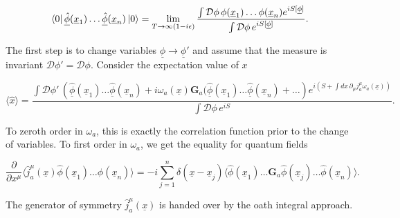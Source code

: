 \begin{equation}
\bra{0} \underline{\hat{\phi}} (\underline{x}_1) \dots \underline{\hat{\phi}} (\underline{x}_n) \ket{0} = \lim_{T \rightarrow \infty(1-i\epsilon)} \frac{\int \mathcal{D}\phi \, \phi (\underline{x}_1) \dots \phi (\underline{x}_n) e^{iS[\underline{\phi}]}}{\int \mathcal{D} \phi \, e^{i S[\underline{\phi}]}}.
\end{equation}

\noindent The first step is to change variables $\underline{\phi} \rightarrow \underline{\phi}'$ and assume that the measure is invariant $\mathcal{D}\phi' = \mathcal{D}\phi$. Consider the expectation value of $x$

\begin{equation}
\langle \hat{x} \rangle = \frac{\int \mathcal{D} \phi' \, \left( \underline{\hat{\phi}} (\underline{x}_1) \dots \underline{\hat{\phi}} (\underline{x}_n) + i \omega_a (\underline{x}) \textbf{G}_a (\underline{\hat{\phi}} (\underline{x}_1) \dots \underline{\hat{\phi}} (\underline{x}_n) + \dots \right) e^{i (S + \int dx \, \partial_\mu j_a^\mu \omega_a (\underline{x}))}}{\int \mathcal{D}\phi \, e^{iS}}.
\end{equation}

\noindent To zeroth order in $\omega_a$, this is exactly the correlation function prior to the change of variables. To first order in $\omega_a$, we get the equality for quantum fields

\begin{equation}
\frac{\partial}{\partial x^\mu} \langle \hat{j}_a^\mu (\underline{x}) \hat{\phi} (\underline{x}_1) \dots \hat{\phi} (\underline{x}_n) \rangle = -i \sum_{j=1}^{n} \delta(\underline{x} - \underline{x}_j) \langle \hat{\phi} (\underline{x}_1) \dots \textbf{G}_a \hat{\phi} (\underline{x}_j) \dots \hat{\phi} (\underline{x}_n) \rangle.
\end{equation}

\noindent The generator of symmetry $\hat{j}_a^\mu (\underline{x})$ is handed over by the oath integral approach.